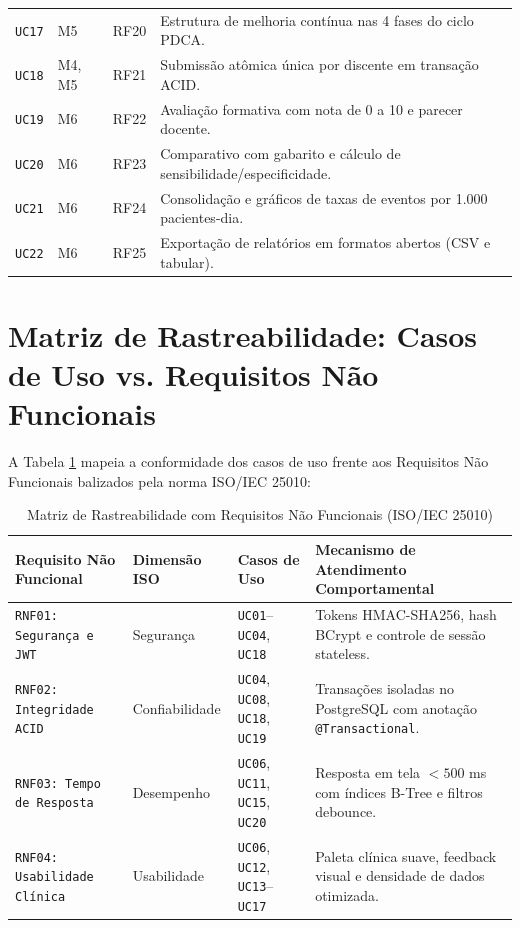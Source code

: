 \begin{table}[!ht]
\begin{tabularx}{\textwidth}{p{2.2cm} p{1.6cm} p{2.4cm} X}
\texttt{UC17} & M5 & RF20 & Estrutura de melhoria contínua nas 4 fases do ciclo PDCA. \\
\texttt{UC18} & M4, M5 & RF21 & Submissão atômica única por discente em transação ACID. \\
\texttt{UC19} & M6 & RF22 & Avaliação formativa com nota de 0 a 10 e parecer docente. \\
\texttt{UC20} & M6 & RF23 & Comparativo com gabarito e cálculo de sensibilidade/especificidade. \\
\texttt{UC21} & M6 & RF24 & Consolidação e gráficos de taxas de eventos por 1.000 pacientes-dia. \\
\texttt{UC22} & M6 & RF25 & Exportação de relatórios em formatos abertos (CSV e tabular). \\
\bottomrule
\end{tabularx}
\end{table}

\section{Matriz de Rastreabilidade: Casos de Uso vs. Requisitos Não Funcionais}
\label{sec_matriz_uc_rnf}

A Tabela \ref{tab_rastreabilidade_uc_rnf} mapeia a conformidade dos casos de uso frente aos Requisitos Não Funcionais balizados pela norma ISO/IEC 25010:

\begin{table}[!ht]
\centering
\caption{Matriz de Rastreabilidade com Requisitos Não Funcionais (ISO/IEC 25010)}
\label{tab_rastreabilidade_uc_rnf}
\footnotesize
\begin{tabularx}{\textwidth}{p{3.2cm} p{2.2cm} p{2.2cm} X}
\toprule
\textbf{Requisito Não Funcional} & \textbf{Dimensão ISO} & \textbf{Casos de Uso} & \textbf{Mecanismo de Atendimento Comportamental} \\
\midrule
\texttt{RNF01: Segurança e JWT} & Segurança & \texttt{UC01}--\texttt{UC04}, \texttt{UC18} & Tokens HMAC-SHA256, hash BCrypt e controle de sessão stateless. \\
\texttt{RNF02: Integridade ACID} & Confiabilidade & \texttt{UC04}, \texttt{UC08}, \texttt{UC18}, \texttt{UC19} & Transações isoladas no PostgreSQL com anotação \texttt{@Transactional}. \\
\texttt{RNF03: Tempo de Resposta} & Desempenho & \texttt{UC06}, \texttt{UC11}, \texttt{UC15}, \texttt{UC20} & Resposta em tela $< 500$ ms com índices B-Tree e filtros debounce. \\
\texttt{RNF04: Usabilidade Clínica} & Usabilidade & \texttt{UC06}, \texttt{UC12}, \texttt{UC13}--\texttt{UC17} & Paleta clínica suave, feedback visual e densidade de dados otimizada. \\
\bottomrule
\end{tabularx}
\end{table}

